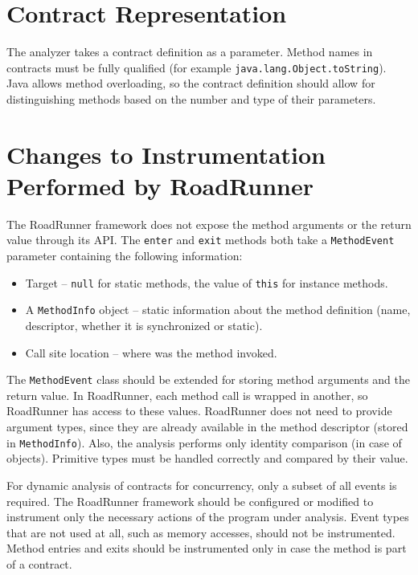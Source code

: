 \section{Contract Representation}

The analyzer takes a contract definition as a parameter. Method names in
contracts must be fully qualified (for example
\texttt{java.lang.Object.toString}). Java allows method overloading, so the
contract definition should allow for distinguishing methods based on the number
and type of their parameters.


\section{Changes to Instrumentation Performed by RoadRunner}

The RoadRunner framework does not expose the method arguments or the return
value through its API. The \texttt{enter} and \texttt{exit} methods both take a
\texttt{MethodEvent} parameter containing the following information:
\begin{itemize}
    \item Target -- \texttt{null} for static methods, the value of \texttt{this}
        for instance methods.
    \item A \texttt{MethodInfo} object -- static information about the method
        definition (name, descriptor, whether it is synchronized or static).
    \item Call site location -- where was the method invoked.
\end{itemize}

The \texttt{MethodEvent} class should be extended for storing method arguments
and the return value. In RoadRunner, each method call is wrapped in another, so
RoadRunner has access to these values. RoadRunner does not need to provide
argument types, since they are already available in the method descriptor
(stored in \texttt{MethodInfo}). Also, the analysis performs only identity
comparison (in case of objects). Primitive types must be handled correctly and
compared by their value.

For dynamic analysis of contracts for concurrency, only a subset of all events
is required. The RoadRunner framework should be configured or modified to
instrument only the necessary actions of the program under analysis. Event types
that are not used at all, such as memory accesses, should not be instrumented.
Method entries and exits should be instrumented only in case the method is part
of a contract.

